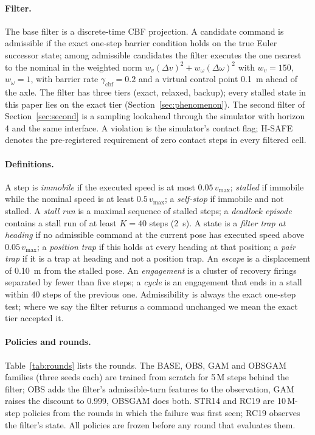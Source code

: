 \documentclass{l4dc2027}
\newcommand{\vmax}{v_{\max}}
\begin{document}
\paragraph{Filter.} The base filter is a discrete-time CBF projection. A candidate command is admissible if the exact one-step barrier condition holds on the true Euler successor state; among admissible candidates the filter executes the one nearest to the nominal in the weighted norm $w_v(\Delta v)^2 + w_\omega(\Delta\omega)^2$ with $w_v = 150$, $w_\omega = 1$, with barrier rate $\gamma_{\mathrm{cbf}} = 0.2$ and a virtual control point \SI{0.1}{m} ahead of the axle. The filter has three tiers (exact, relaxed, backup); every stalled state in this paper lies on the exact tier (Section~\ref{sec:phenomenon}). The second filter of Section~\ref{sec:second} is a sampling lookahead through the simulator with horizon 4 and the same interface. A violation is the simulator's contact flag; H-SAFE denotes the pre-registered requirement of zero contact steps in every filtered cell.

\paragraph{Definitions.} A step is \emph{immobile} if the executed speed is at most $0.05\,\vmax$; \emph{stalled} if immobile while the nominal speed is at least $0.5\,\vmax$; a \emph{self-stop} if immobile and not stalled. A \emph{stall run} is a maximal sequence of stalled steps; a \emph{deadlock episode} contains a stall run of at least $K = 40$ steps (\SI{2}{s}). A state is a \emph{filter trap at heading} if no admissible command at the current pose has executed speed above $0.05\,\vmax$; a \emph{position trap} if this holds at every heading at that position; a \emph{pair trap} if it is a trap at heading and not a position trap. An \emph{escape} is a displacement of \SI{0.10}{m} from the stalled pose. An \emph{engagement} is a cluster of recovery firings separated by fewer than five steps; a \emph{cycle} is an engagement that ends in a stall within 40 steps of the previous one. Admissibility is always the exact one-step test; where we say the filter returns a command unchanged we mean the exact tier accepted it.

\paragraph{Policies and rounds.} Table~\ref{tab:rounds} lists the rounds. The BASE, OBS, GAM and OBSGAM families (three seeds each) are trained from scratch for 5\,M steps behind the filter; OBS adds the filter's admissible-turn features to the observation, GAM raises the discount to 0.999, OBSGAM does both. STR14 and RC19 are 10\,M-step policies from the rounds in which the failure was first seen; RC19 observes the filter's state. All policies are frozen before any round that evaluates them.
\end{document}
